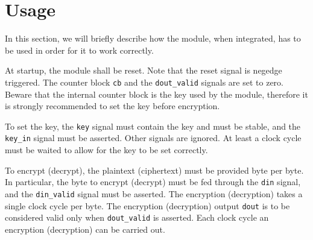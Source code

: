 \section{Usage}
\label{sec:usage}
In this section, we will briefly describe how the module, when integrated, has to be used in order for it to work correctly.

At startup, the module shall be reset. Note that the reset signal is negedge triggered. The counter block \lstinline{cb} and the \lstinline{dout_valid} signals are set to zero.
Beware that the internal counter block is the key used by the module, therefore it is strongly recommended to set the key before encryption.

To set the key, the \lstinline{key} signal must contain the key and must be stable, and the \lstinline{key_in} signal must be asserted. Other signals are ignored. At least a clock cycle must be waited to allow for the key to be set correctly.

To encrypt (decrypt), the plaintext (ciphertext) must be provided byte per byte. In particular, the byte to encrypt (decrypt) must be fed through the \lstinline{din} signal, and the \lstinline{din_valid} signal must be asserted. The encryption (decryption) takes a single clock cycle per byte. The encryption (decryption) output \lstinline{dout} is to be considered valid only when \lstinline{dout_valid} is asserted. Each clock cycle an encryption (decryption) can be carried out.